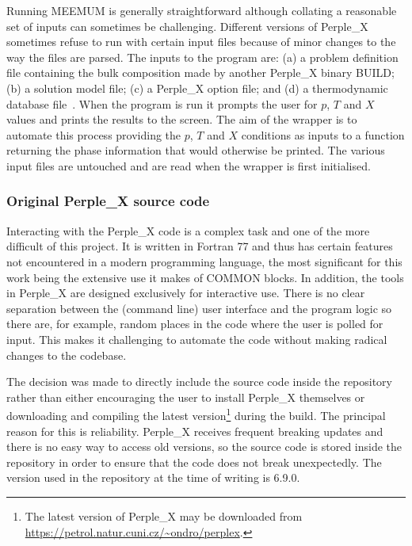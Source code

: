 Running MEEMUM is generally straightforward although collating a reasonable set of inputs can sometimes be challenging.
Different versions of Perple\_X sometimes refuse to run with certain input files because of minor changes to the way the files are parsed.
The inputs to the program are: 
(a) a problem definition file containing the bulk composition made by another Perple\_X binary BUILD;
(b) a solution model file;
(c) a Perple\_X option file; and
(d) a thermodynamic database file~\parencite[e.g.][]{holland_internally_1998}.
When the program is run it prompts the user for $p$, $T$ and $X$ values and prints the results to the screen.
The aim of the wrapper is to automate this process providing the $p$, $T$ and $X$ conditions as inputs to a function returning the phase information that would otherwise be printed.
The various input files are untouched and are read when the wrapper is first initialised.

\subsubsection{Original Perple\_X source code}
\label{sec:solution_perplexcpp_orig}

Interacting with the Perple\_X code is a complex task and one of the more difficult of this project.
It is written in Fortran 77 and thus has certain features not encountered in a modern programming language, the most significant for this work being the extensive use it makes of COMMON blocks.
In addition, the tools in Perple\_X are designed exclusively for interactive use.
There is no clear separation between the (command line) user interface and the program logic so there are, for example, random places in the code where the user is polled for input.
This makes it challenging to automate the code without making radical changes to the codebase.

The decision was made to directly include the source code inside the repository rather than either encouraging the user to install Perple\_X themselves or downloading and compiling the latest version\footnote{The latest version of Perple\_X may be downloaded from \url{https://petrol.natur.cuni.cz/~ondro/perplex}.} during the build.
The principal reason for this is reliability. Perple\_X receives frequent breaking updates and there is no easy way to access old versions, so the source code is stored inside the repository in order to ensure that the code does not break unexpectedly.
The version used in the repository at the time of writing is 6.9.0.

